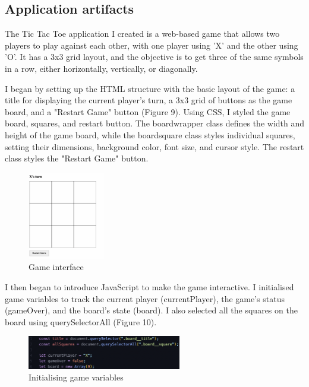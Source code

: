 \documentclass[a4paper, 11pt]{report}
\begin{document}
\subsection{Application artifacts}

The Tic Tac Toe application I created is a web-based game that allows two players to play against each other, with one player using 'X' and the other using 'O'. It has a 3x3 grid layout, and the objective is to get three of the same symbols in a row, either horizontally, vertically, or diagonally.

I began by setting up the HTML structure with the basic layout of the game: a title for displaying the current player's turn, a 3x3 grid of buttons as the game board, and a "Restart Game" button (Figure 9). Using CSS, I styled the game board, squares, and restart button. The boardwrapper class defines the width and height of the game board, while the boardsquare class styles individual squares, setting their dimensions, background color, font size, and cursor style. The restart class styles the "Restart Game" button.


\begin{figure}[ht]
    \centering
    \includegraphics[width=0.3\textwidth]{Images/ttt1.png}
    \caption{Game interface}
    \label{fig:screenshot}
\end{figure}

I then began to introduce JavaScript to make the game interactive. I initialised game variables to track the current player (currentPlayer), the game's status (gameOver), and the board's state (board). I also selected all the squares on the board using querySelectorAll (Figure 10).

\begin{figure}[ht]
    \centering
    \includegraphics[width=0.6\textwidth]{Images/ttt2.png}
    \caption{Initialising game variables}
    \label{fig:screenshot}
\end{figure}
\end{document}
